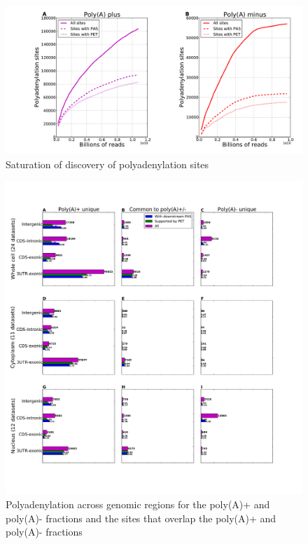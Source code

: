 \begin{figure}[hb]
	\begin{center}
		\includegraphics[scale=0.3]{figures/polyadenylation/Saturation_plot_2+.pdf}
	\end{center}
	\caption{Saturation of discovery of polyadenylation sites}
	\label{fig:saturation}
\end{figure}

\begin{figure}[hb]
	\begin{center}
		\includegraphics[scale=0.3]{figures/polyadenylation/intersected_sidebars_pA_2+.pdf}
	\end{center}
	\caption{Polyadenylation across genomic regions for the poly(A)+ and poly(A)-
	fractions and the sites that overlap the poly(A)+ and poly(A)- fractions}
	\label{fig:sidebars_intersect}
\end{figure}


